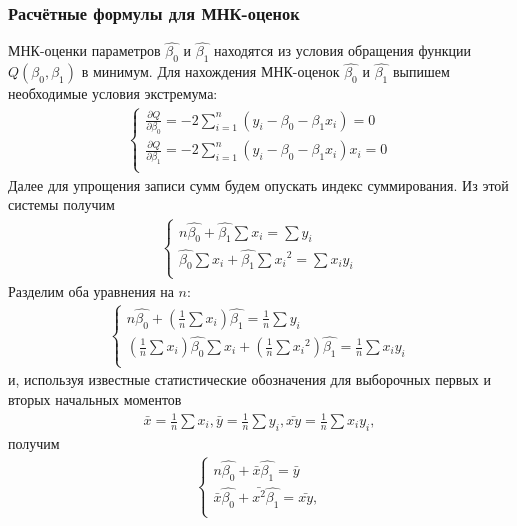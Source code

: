         \subsubsection{Расчётные формулы для МНК-оценок}
        МНК-оценки параметров $\hat{\beta_0}$ и $\hat{\beta_1}$ находятся из условия обращения функции $Q(\beta_0, \beta_1)$ в минимум. Для нахождения МНК-оценок $\hat{\beta_0}$ и $\hat{\beta_1}$ выпишем необходимые условия экстремума:
        \begin{gather}
        \begin{cases} 
        \frac{\partial{Q}}{\partial{\beta_0}} = -2\sum_{i=1}^{n}(y_i - \beta_0 - \beta_1x_i) = 0\\
        \frac{\partial{Q}}{\partial{\beta_1}} = -2\sum_{i=1}^{n}(y_i - \beta_0 - \beta_1x_i)x_i = 0 \\ 
        \end{cases}
         \end{gather}
         Далее для упрощения записи сумм будем опускать индекс суммирования. Из этой системы получим
          \begin{gather}
        \begin{cases} 
        n\hat{\beta_0} + \hat{\beta_1}\sum{x_i} = \sum{y_i}\\
        \hat{\beta_0}\sum{x_i} + \hat{\beta_1}\sum{{x_i}^2} = \sum{x_{i}y_i} \\ 
        \end{cases}
         \end{gather}
         Разделим оба уравнения на $n$:
         \begin{gather}
        \begin{cases} 
        n\hat{\beta_0} + (\frac{1}{n}\sum{x_i})\hat{\beta_1} = \frac{1}{n}\sum{y_i}\\
        (\frac{1}{n}\sum{x_i})\hat{\beta_0}\sum{x_i} + (\frac{1}{n}\sum{{x_i}^2})\hat{\beta_1} = \frac{1}{n}\sum{x_{i}y_i} \\ 
        \end{cases}
         \end{gather}
         и, используя известные статистические обозначения для выборочных первых и вторых начальных моментов
         \begin{gather*}
             \bar{x} = \frac{1}{n}\sum{x_i},  \bar{y} = \frac{1}{n}\sum{y_i},  \bar{xy} = \frac{1}{n}\sum{{x_i}y_i},
         \end{gather*}
         получим
         \begin{gather}
        \begin{cases} 
        n\hat{\beta_0} + \bar{x}\hat{\beta_1} = \bar{y}\\
        \bar{x}\hat{\beta_0} + \bar{x^2}\hat{\beta_1} = \bar{xy}, \\ 
        \end{cases}
         \end{gather}
